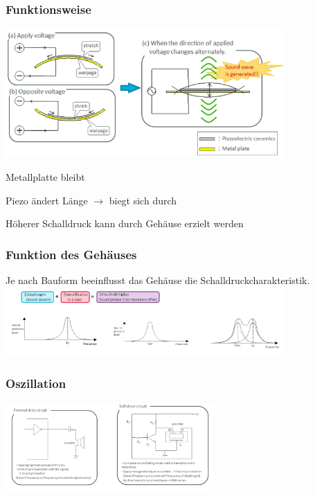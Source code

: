 \subsubsection{Funktionsweise}
\begin{minipage}{0.5\textwidth}
    \includegraphics[width=0.8\textwidth]{images/Buzzer_Funktionsweise}
\end{minipage}
\hfill
\begin{minipage}{0.45\textwidth}
    \begin{compactitem}
        \item Metallplatte bleibt
        \item Piezo ändert Länge $\rightarrow$ biegt sich durch
        \item Höherer Schalldruck kann durch Gehäuse erzielt werden
    \end{compactitem}
\end{minipage}
\subsubsection{Funktion des Gehäuses}
 Je nach Bauform beeinflusst das Gehäuse die Schalldruckcharakteristik.
 \includegraphics[width=0.8\textwidth]{images/FunktionDesGehaeuses}
\subsubsection{Oszillation}
\includegraphics[width=0.6\textwidth]{images/OszillationBuzzer}

